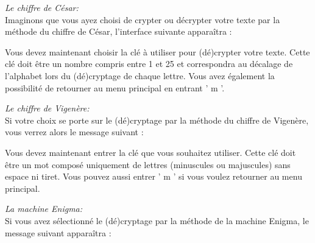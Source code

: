 \documentclass[a4paper,12pt,abstracton,titlepage]{scrartcl}
\begin{document}
\textit{Le chiffre de César:}\\
Imaginons que vous ayez choisi de crypter ou décrypter votre texte par la méthode du chiffre de César, l'interface suivante apparaîtra :

\vspace{0.5cm}
{
\label{FCe}
}
\vspace{0.5cm}

Vous devez maintenant choisir la clé à utiliser pour (dé)crypter votre texte. Cette clé doit être un nombre compris entre 1 et 25 et correspondra au décalage de l'alphabet lors du (dé)cryptage de chaque lettre.
Vous avez également la possibilité de retourner au menu principal en entrant ' m '.\\
\vspace{0.5cm}

\newpage
\textit{Le chiffre de Vigenère:}\\
Si votre choix se porte sur le (dé)cryptage par la méthode du chiffre de Vigenère, vous verrez alors le message suivant :

\vspace{0.5cm}
{
\label{FV}
}
\vspace{0.5cm}

Vous devez maintenant entrer la clé que vous souhaitez utiliser. Cette clé doit être un mot composé uniquement de lettres (minuscules ou majuscules) sans espace ni tiret. 
Vous pouvez aussi entrer ' m ' si vous voulez retourner au menu principal.\\
\vspace{0.5cm}

\textit{La machine Enigma:}\\
Si vous avez sélectionné le (dé)cryptage par la méthode de la machine Enigma, le message suivant apparaîtra :
\end{document}
